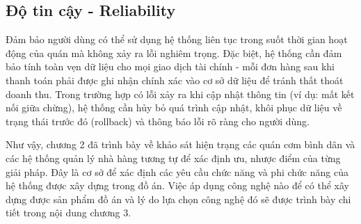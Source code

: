 \documentclass[../20232006p.tex]{subfiles}
\begin{document}
\subsection{Độ tin cậy - Reliability}
Đảm bảo người dùng có thể sử dụng hệ thống liên tục trong suốt thời gian hoạt động của quán mà không xảy ra lỗi nghiêm trọng. Đặc biệt, hệ thống cần đảm bảo tính toàn vẹn dữ liệu cho mọi giao dịch tài chính - mỗi đơn hàng sau khi thanh toán phải được ghi nhận chính xác vào cơ sở dữ liệu để tránh thất thoát doanh thu. Trong trường hợp có lỗi xảy ra khi cập nhật thông tin (ví dụ: mất kết nối giữa chừng), hệ thống cần hủy bỏ quá trình cập nhật, khôi phục dữ liệu về trạng thái trước đó (rollback) và thông báo lỗi rõ ràng cho người dùng.

Như vậy, chương 2 đã trình bày về khảo sát hiện trạng các quán cơm bình dân và các hệ thống quản lý nhà hàng tương tự để xác định ưu, nhược điểm của từng giải pháp. Đây là cơ sở để xác định các yêu cầu chức năng và phi chức năng của hệ thống được xây dựng trong đồ án. Việc áp dụng công nghệ nào để có thể xây dựng được sản phẩm đồ án và lý do lựa chọn công nghệ đó sẽ được trình bày chi tiết trong nội dung chương 3.
\end{document}
